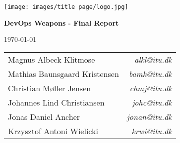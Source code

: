 \begin{titlepage}
    \centering
    \texttt{[image: images/title page/logo.jpg]}\\
    \vspace*{\fill}
    {\LARGE \textbf{DevOps Weapons - Final Report} \par}
    \vspace{1cm}
    {\large \today \par}
    \vspace{1cm}
        \begin{table}[h!]
        \centering
        \begin{tabular}{lr}
        Magnus Albeck Klitmose        & \textit{alkl@itu.dk}  \\
        Mathias Baunsgaard Kristensen & \textit{bamk@itu.dk}  \\
        Christian Møller Jensen       & \textit{chmj@itu.dk}  \\
        Johannes Lind Christiansen    & \textit{johc@itu.dk}  \\
        Jonas Daniel Ancher           & \textit{jonan@itu.dk} \\
        Krzysztof Antoni Wielicki     & \textit{krwi@itu.dk}
        \end{tabular}
        \end{table}    
    \vspace*{\fill}
\end{titlepage}
